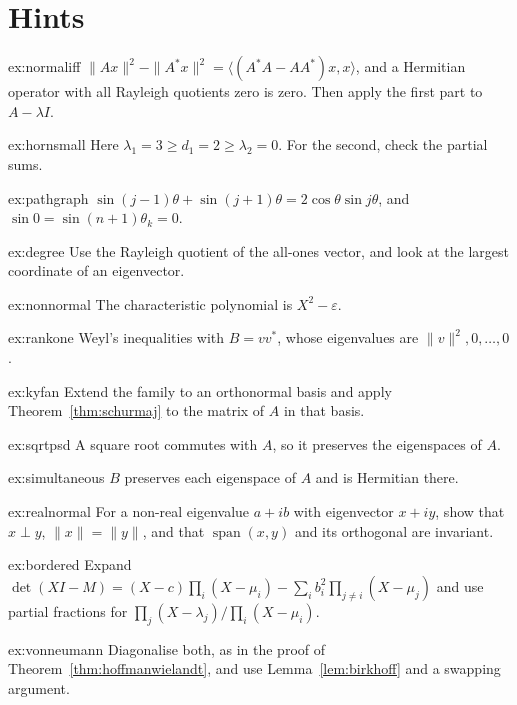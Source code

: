 \section{Hints}

\begin{hint}{ex:normaliff}
$\|Ax\|^2-\|A^*x\|^2=\langle(A^*A-AA^*)x,x\rangle$, and a Hermitian operator with all Rayleigh quotients zero is zero. Then
apply the first part to $A-\lambda I$.
\end{hint}
\begin{hint}{ex:hornsmall}
Here $\lambda_1=3\ge d_1=2\ge\lambda_2=0$. For the second, check the partial sums.
\end{hint}
\begin{hint}{ex:pathgraph}
$\sin(j-1)\theta+\sin(j+1)\theta=2\cos\theta\sin j\theta$, and $\sin0=\sin(n+1)\theta_k=0$.
\end{hint}
\begin{hint}{ex:degree}
Use the Rayleigh quotient of the all-ones vector, and look at the largest coordinate of an eigenvector.
\end{hint}
\begin{hint}{ex:nonnormal}
The characteristic polynomial is $X^2-\varepsilon$.
\end{hint}
\begin{hint}{ex:rankone}
Weyl's inequalities with $B=vv^*$, whose eigenvalues are $\|v\|^2,0,\dots,0$.
\end{hint}
\begin{hint}{ex:kyfan}
Extend the family to an orthonormal basis and apply Theorem~\ref{thm:schurmaj} to the matrix of $A$ in that basis.
\end{hint}
\begin{hint}{ex:sqrtpsd}
A square root commutes with $A$, so it preserves the eigenspaces of $A$.
\end{hint}
\begin{hint}{ex:simultaneous}
$B$ preserves each eigenspace of $A$ and is Hermitian there.
\end{hint}
\begin{hint}{ex:realnormal}
For a non-real eigenvalue $a+ib$ with eigenvector $x+iy$, show that $x\perp y$, $\|x\|=\|y\|$, and that $\operatorname{span}(x,y)$
and its orthogonal are invariant.
\end{hint}
\begin{hint}{ex:bordered}
Expand $\det(XI-M)=(X-c)\prod_i(X-\mu_i)-\sum_ib_i^2\prod_{j\ne i}(X-\mu_j)$ and use partial fractions for
$\prod_j(X-\lambda_j)/\prod_i(X-\mu_i)$.
\end{hint}
\begin{hint}{ex:vonneumann}
Diagonalise both, as in the proof of Theorem~\ref{thm:hoffmanwielandt}, and use Lemma~\ref{lem:birkhoff} and a swapping argument.
\end{hint}

